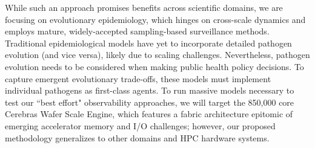 While such an approach promises benefits across scientific domains, we are focusing on evolutionary epidemiology, which hinges on cross-scale dynamics and employs mature, widely-accepted sampling-based surveillance methods.
Traditional epidemiological models have yet to incorporate detailed pathogen evolution (and vice versa), likely due to %
scaling challenges.%
Nevertheless, pathogen evolution needs to be considered when making public health policy decisions.
To capture emergent evolutionary trade-offs, these models must implement individual pathogens as first-class agents.
To run massive models necessary to test our ``best effort" observability approaches, we will target the 850,000 core Cerebras Wafer Scale Engine, which features a fabric architecture epitomic of emerging accelerator memory and I/O challenges; however, our proposed methodology generalizes to other domains and HPC hardware systems.



